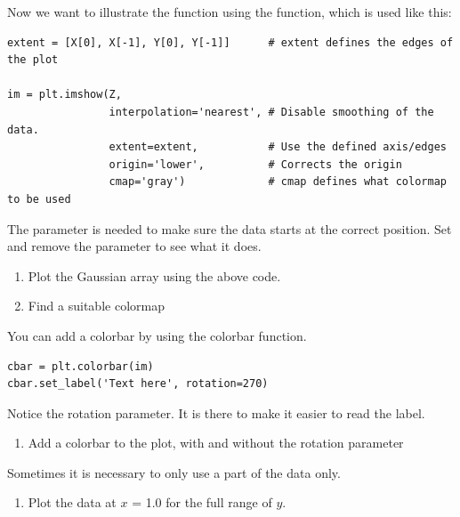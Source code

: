\documentclass{article}
\begin{document}
Now we want to illustrate the function using the  function, which is used like this:

\begin{lstlisting}
extent = [X[0], X[-1], Y[0], Y[-1]]      # extent defines the edges of the plot

im = plt.imshow(Z,
                interpolation='nearest', # Disable smoothing of the data.
                extent=extent,           # Use the defined axis/edges
                origin='lower',          # Corrects the origin
                cmap='gray')             # cmap defines what colormap to be used
\end{lstlisting}

The  parameter is needed to make sure the data starts at the correct position.
Set  and remove the parameter to see what it does.

\begin{enumerate}[resume]

    \item Plot the Gaussian array using the above code.

    \item Find a suitable colormap

\end{enumerate}

You can add a colorbar by using the colorbar function.

\begin{lstlisting}
cbar = plt.colorbar(im)
cbar.set_label('Text here', rotation=270)
\end{lstlisting}

Notice the rotation parameter. It is there to make it easier to read the label.

\begin{enumerate}[resume]

    \item Add a colorbar to the plot, with and without the rotation parameter

\end{enumerate}

Sometimes it is necessary to only use a part of the data only.

\begin{enumerate}[resume]

    \item Plot the data at $x$ = 1.0 for the full range of $y$.

\end{enumerate}


\end{document}
